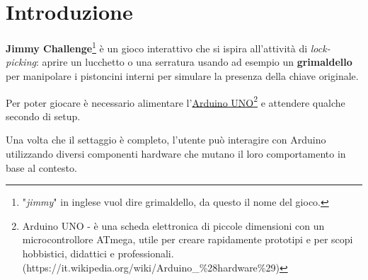 \chapter{Introduzione}
\textbf{Jimmy Challenge}\footnote{"\textit{jimmy}" in inglese vuol dire grimaldello, da questo il nome del gioco.} è un gioco interattivo che si ispira all'attività di \textit{lock-picking}: aprire un lucchetto o una serratura usando ad esempio un \textbf{grimaldello} per manipolare i pistoncini interni per simulare la presenza della chiave originale.

Per poter giocare è necessario alimentare l'\href{https://www.arduino.cc/en/Main/ArduinoBoardUno}{Arduino UNO\footnote{Arduino UNO - è una scheda elettronica di piccole dimensioni con un microcontrollore ATmega, utile per creare rapidamente prototipi e per scopi hobbistici, didattici e professionali. (\url{https://it.wikipedia.org/wiki/Arduino\_\%28hardware\%29})}} e attendere qualche secondo di setup.

Una volta che il settaggio è completo, l'utente può interagire con Arduino utilizzando diversi componenti hardware che mutano il loro comportamento in base al contesto.




